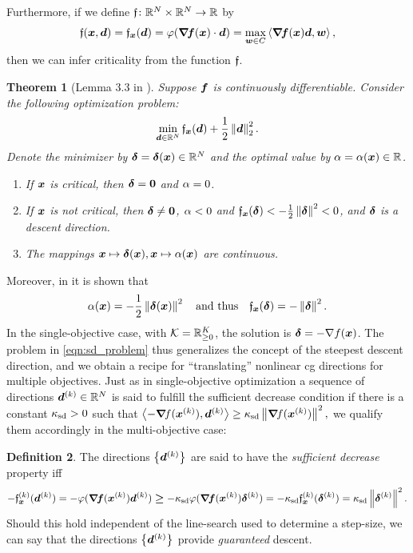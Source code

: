 \documentclass{article}
\theoremstyle{plain}
\newtheorem{theorem}{Theorem}
\theoremstyle{definition}
\newtheorem{definition}[theorem]{Definition}
\begin{document}
Furthermore, if we define $\mathfrak{f}\colon \mathbb R^N\times\mathbb R^N \to \mathbb R$ by
\begin{equation*}
	\mathfrak{f}(\bm{x}, \bm{d})
	=
		\mathfrak{f}_{\bm{x}}(\bm{d})
	= 
		\varphi(\bm{\nabla}\!\bm{f}(\bm{x})\cdot\bm{d}) 
	= 
		\max_{\bm{w}\in C} \left\langle \bm{\nabla}\!\bm{f}(\bm{x})\bm{d}, \bm{w} \right\rangle
	,
\end{equation*}
then we can infer criticality from the function $\mathfrak{f}$.

\begin{theorem}[{Lemma 3.3 in \cite{granadrummondSteepestDescentMethod2005}}]%
	\label{thm:criticality_properties}
	Suppose $\bm{f}$ is continuously differentiable.
	Consider the following optimization problem:
	\begin{equation}
		\min_{\bm{d}\in \mathbb R^N} 
			\mathfrak{f}_{\bm{x}}(\bm{d}) + \frac{1}{2}\left\|\bm{d}\right\|_2^2
		.
		\label{eqn:sd_problem}
	\end{equation}
	Denote the minimizer by $\bm{\delta} = \bm{\delta}(\bm{x}) \in \mathbb R^N$ and 
	the optimal value by $\alpha = \alpha(\bm{x}) \in \mathbb R$.
	\begin{enumerate}
		\item If $\bm{x}$ is critical, then $\bm{\delta} = \bm{0}$ and $\alpha = 0$.
		\item If $\bm{x}$ is \emph{not} critical, then $\bm{\delta} \neq \bm{0}$, $\alpha<0$
			and $\mathfrak{f}_{\bm{x}}(\bm{\delta}) < - \frac{1}{2}\left\|\bm{\delta}\right\|^2 < 0$,
			and $\bm{\delta}$ is a descent direction.
		\item The mappings $\bm{x} \mapsto \bm{\delta}(\bm{x}), \bm{x} \mapsto \alpha(\bm{x})$ are
			continuous.
	\end{enumerate}
\end{theorem}
Moreover, in \cite{granadrummondSteepestDescentMethod2005} it is shown that
$$
\alpha(\bm{x}) = - \frac{1}{2}\left\|\bm{\delta}(\bm{x})\right\|^2
\quad\text{and thus}\quad
\mathfrak{f}_{\bm{x}}(\bm{\delta}) = -\left\|\bm{\delta}\right\|^2.
$$
In the single-objective case, with $\mathcal K = \mathbb R^K_{\ge 0}$, the solution is 
$\bm{\delta} = - \nabla f(\bm{x})$.
The problem in \eqref{eqn:sd_problem} thus generalizes the concept of 
the steepest descent direction, and we obtain a recipe for 
“translating” nonlinear \ac{cg} directions for multiple objectives.
Just as in single-objective optimization a sequence of directions 
$\bm{d}^{(k)}\in \mathbb R^N$ 
is said to fulfill the sufficient decrease condition if there is a constant
$\kappa_{\mathrm{sd}} > 0$ such that
$\left\langle -\bm{\nabla}\!f(\bm{x}^{(k)}), \bm{d}^{(k)} \right\rangle \geq \kappa_{\mathrm{sd}} \left\|\bm{\nabla}\!f(\bm{x}^{(k)})\right\|^2,$
we qualify them accordingly in the multi-objective case:

\begin{definition}
The directions $\left\{\bm{d}^{(k)}\right\}$ are said to have the 
\emph{sufficient decrease} property iff	
\begin{equation}
- 
	\mathfrak{f}_{\bm{x}}^{(k)}(\bm{d}^{(k)}) 
=
	-\varphi(\bm{\nabla}\!\bm{f}(\bm{x}^{(k)})\bm{d}^{(k)}) 
\bm{\geq}
	- \kappa_{\mathrm{sd}} \varphi(\bm{\nabla}\!\bm{f}(\bm{x}^{(k)})\bm{\delta}^{(k)})
= 
	- \kappa_{\mathrm{sd}} \mathfrak{f}_{\bm{x}}^{(k)}(\bm{\delta}^{(k)})
=
	\kappa_{\mathrm{sd}} \left\|\bm{\delta}^{(k)}\right\|^2.
\label{eqn:suff_dec}
\end{equation}
Should this hold independent of the line-search used to 
determine a step-size, we can say that the directions
$\left\{\bm{d}^{(k)}\right\}$ provide \emph{guaranteed} descent.
\end{definition}
\end{document}
